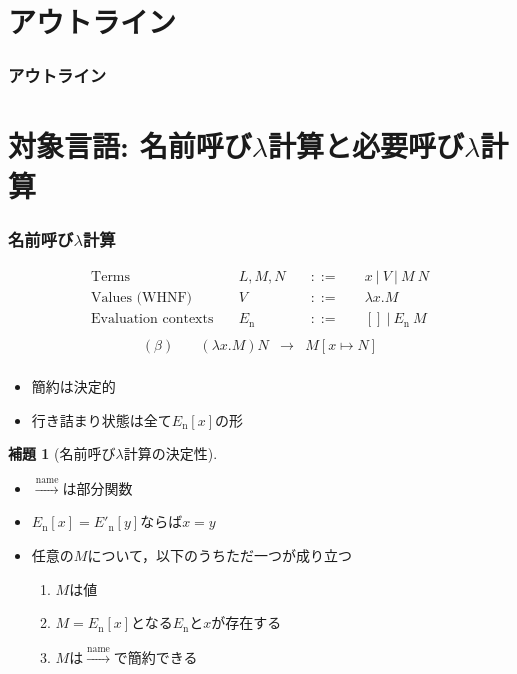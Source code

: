 \documentclass[dvipdfmx,cjk,xcolor=dvipsnames,envcountsect,notheorems,12pt]{beamer}
\theoremstyle{definition}
\newtheorem{lemma}{補題}
\newcommand{\CALLBYNAME}{\xrightarrow{\mathrm{name}}}
\begin{document}
\section*{アウトライン}
\begin{frame}
  \frametitle{アウトライン}
  \tableofcontents[sectionstyle=show,subsectionstyle=hide]
\end{frame}

\section{対象言語: 名前呼び$\lambda$計算と必要呼び$\lambda$計算}

\begin{frame}
	\frametitle{名前呼び$\lambda$計算}
	\[ \begin{array}{llcl}
		\mbox{Terms}\quad & L,M,N\quad & ::=\quad & x~|~V~|~M~N \\
		\mbox{Values (WHNF)}\quad & V\quad & ::=\quad & \lambda x.M \\
		\mbox{Evaluation contexts}\quad & E_\mathrm{n}\quad & ::=\quad & [] ~|~ E_\mathrm{n}~M \\
	\end{array} \]
	\[ \begin{array}{lrcl}
		(\beta)\quad & (\lambda x.M)N & \rightarrow & M[x \mapsto N] \\
	\end{array} \]
	\begin{itemize}
		\item 簡約は決定的
		\item 行き詰まり状態は全て$E_\mathrm{n}[x]$の形
	\end{itemize}
\end{frame}

\begin{frame}
	\begin{lemma}[名前呼び$\lambda$計算の決定性]
	\begin{itemize}
		\item $\CALLBYNAME$は部分関数
		\item $E_\mathrm{n}[x]=E'_\mathrm{n}[y]$ならば$x=y$
		\item 任意の$M$について，以下のうちただ一つが成り立つ
			\begin{enumerate}
				\item $M$は値
				\item $M=E_\mathrm{n}[x]$となる$E_\mathrm{n}$と$x$が存在する
				\item $M$は$\CALLBYNAME$で簡約できる
			\end{enumerate}
	\end{itemize}
	\end{lemma}
\end{frame}
\end{document}
